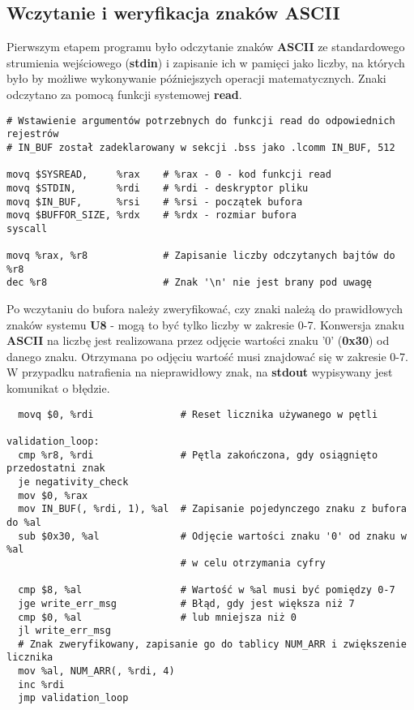 \documentclass[11pt]{report}
\begin{document}
\subsection{Wczytanie i weryfikacja znaków ASCII}
Pierwszym etapem programu było odczytanie znaków \textbf{ASCII} ze standardowego strumienia wejściowego (\textbf{stdin}) i zapisanie ich w pamięci jako liczby, na których było by możliwe wykonywanie późniejszych operacji matematycznych. Znaki odczytano za pomocą funkcji systemowej \textbf{read}.
\begin{verbatim}
# Wstawienie argumentów potrzebnych do funkcji read do odpowiednich rejestrów 
# IN_BUF został zadeklarowany w sekcji .bss jako .lcomm IN_BUF, 512

movq $SYSREAD,     %rax    # %rax - 0 - kod funkcji read
movq $STDIN,       %rdi    # %rdi - deskryptor pliku
movq $IN_BUF,      %rsi    # %rsi - początek bufora
movq $BUFFOR_SIZE, %rdx    # %rdx - rozmiar bufora
syscall

movq %rax, %r8             # Zapisanie liczby odczytanych bajtów do %r8
dec %r8                    # Znak '\n' nie jest brany pod uwagę
\end{verbatim}
\newpage
\noindent
Po wczytaniu do bufora należy zweryfikować, czy znaki należą do prawidłowych znaków systemu \textbf{U8} - mogą to być tylko liczby w zakresie 0-7. Konwersja znaku \textbf{ASCII} na liczbę jest realizowana przez odjęcie wartości znaku '0' (\textbf{0x30}) od danego znaku. Otrzymana po odjęciu wartość musi znajdować się w zakresie 0-7. W przypadku natrafienia na nieprawidłowy znak, na \textbf{stdout} wypisywany jest komunikat o błędzie.
\begin{verbatim}
  movq $0, %rdi               # Reset licznika używanego w pętli
  
validation_loop:
  cmp %r8, %rdi               # Pętla zakończona, gdy osiągnięto przedostatni znak
  je negativity_check
  mov $0, %rax
  mov IN_BUF(, %rdi, 1), %al  # Zapisanie pojedynczego znaku z bufora do %al
  sub $0x30, %al              # Odjęcie wartości znaku '0' od znaku w %al
                              # w celu otrzymania cyfry

  cmp $8, %al                 # Wartość w %al musi być pomiędzy 0-7
  jge write_err_msg           # Błąd, gdy jest większa niż 7
  cmp $0, %al                 # lub mniejsza niż 0
  jl write_err_msg
  # Znak zweryfikowany, zapisanie go do tablicy NUM_ARR i zwiększenie licznika
  mov %al, NUM_ARR(, %rdi, 4)
  inc %rdi
  jmp validation_loop
\end{verbatim}
\end{document}
